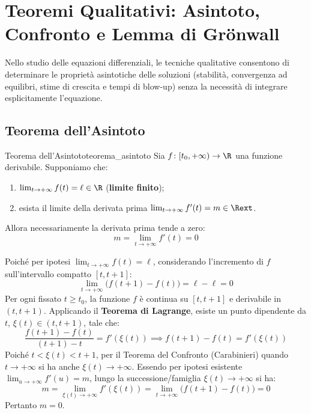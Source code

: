 \newpage

\section{Teoremi Qualitativi: Asintoto, Confronto e Lemma di Grönwall}
\label{sec:teoremi_qualitativi}

Nello studio delle equazioni differenziali, le tecniche qualitative consentono di determinare le proprietà asintotiche delle soluzioni (stabilità, convergenza ad equilibri, stime di crescita e tempi di blow-up) senza la necessità di integrare esplicitamente l'equazione.

\subsection{Teorema dell'Asintoto}

\begin{teorema}{Teorema dell'Asintoto}{teorema_asintoto}
Sia $f \colon [t_0, +\infty) \to \R$ una funzione derivabile. Supponiamo che:
\begin{enumerate}
    \item $\lim_{t \to +\infty} f(t) = \ell \in \R$ \quad (\textbf{limite finito});
    \item esista il limite della derivata prima $\lim_{t \to +\infty} f'(t) = m \in \Rext$.
\end{enumerate}
Allora necessariamente la derivata prima tende a zero:
\begin{equation}
    \label{eq:tesi_asintoto}
    m = \lim_{t \to +\infty} f'(t) = 0
\end{equation}
\end{teorema}

\begin{dimostrazione}
Poiché per ipotesi $\lim_{t \to +\infty} f(t) = \ell$, considerando l'incremento di $f$ sull'intervallo compatto $[t, t+1]$:
\[
    \lim_{t \to +\infty} \big( f(t+1) - f(t) \big) = \ell - \ell = 0
\]
Per ogni fissato $t \ge t_0$, la funzione $f$ è continua su $[t, t+1]$ e derivabile in $(t, t+1)$. Applicando il \textbf{Teorema di Lagrange}, esiste un punto dipendente da $t$, $\xi(t) \in (t, t+1)$, tale che:
\[
    \frac{f(t+1) - f(t)}{(t+1) - t} = f'(\xi(t)) \implies f(t+1) - f(t) = f'(\xi(t))
\]
Poiché $t < \xi(t) < t+1$, per il Teorema del Confronto (Carabinieri) quando $t \to +\infty$ si ha anche $\xi(t) \to +\infty$.
Essendo per ipotesi esistente $\lim_{u \to +\infty} f'(u) = m$, lungo la successione/famiglia $\xi(t) \to +\infty$ si ha:
\[
    m = \lim_{\xi(t) \to +\infty} f'(\xi(t)) = \lim_{t \to +\infty} \big( f(t+1) - f(t) \big) = 0
\]
Pertanto $m = 0$.
\end{dimostrazione}

